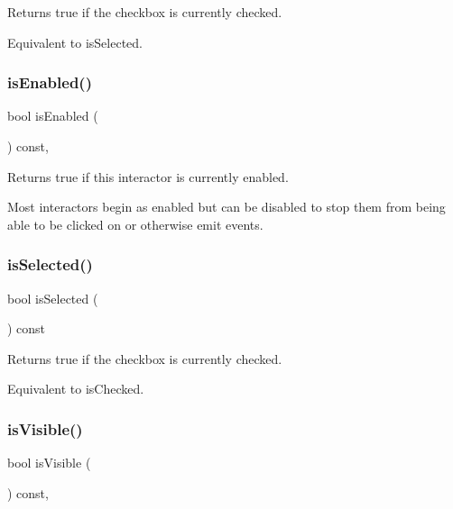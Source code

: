 Returns true if the checkbox is currently checked. 

Equivalent to is\+Selected. \mbox{\label{classGInteractor_aacb819fb241851fd9fc045271baa4034}} 
\subsubsection{\texorpdfstring{is\+Enabled()}{isEnabled()}}
{\footnotesize\ttfamily bool is\+Enabled (\begin{DoxyParamCaption}{ }\end{DoxyParamCaption}) const\hspace{0.3cm}{\ttfamily [virtual]}, {\ttfamily [inherited]}}



Returns true if this interactor is currently enabled. 

Most interactors begin as enabled but can be disabled to stop them from being able to be clicked on or otherwise emit events. \mbox{\label{classGCheckBox_a56a065a2c20a230931de0ed98019d8fb}} 
\subsubsection{\texorpdfstring{is\+Selected()}{isSelected()}}
{\footnotesize\ttfamily bool is\+Selected (\begin{DoxyParamCaption}{ }\end{DoxyParamCaption}) const\hspace{0.3cm}{\ttfamily [virtual]}}



Returns true if the checkbox is currently checked. 

Equivalent to is\+Checked. \mbox{\label{classGInteractor_a9d8a6cfb13917785c143e74d40e4e2be}} 
\subsubsection{\texorpdfstring{is\+Visible()}{isVisible()}}
{\footnotesize\ttfamily bool is\+Visible (\begin{DoxyParamCaption}{ }\end{DoxyParamCaption}) const\hspace{0.3cm}{\ttfamily [virtual]}, {\ttfamily [inherited]}}



